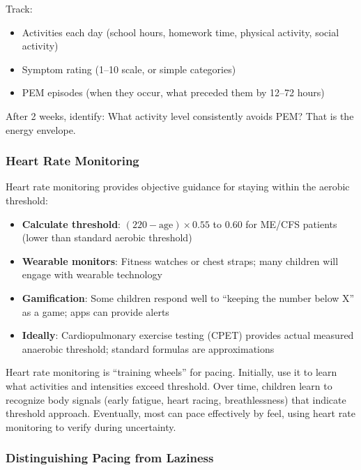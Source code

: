 Track:
\begin{itemize}
    \item Activities each day (school hours, homework time, physical activity, social activity)
    \item Symptom rating (1--10 scale, or simple categories)
    \item PEM episodes (when they occur, what preceded them by 12--72 hours)
\end{itemize}

After 2 weeks, identify: What activity level consistently avoids PEM? That is the energy envelope.

\subsubsection{Heart Rate Monitoring}

Heart rate monitoring provides objective guidance for staying within the aerobic threshold:

\begin{itemize}
    \item \textbf{Calculate threshold}: $(220 - \text{age}) \times 0.55$ to $0.60$ for ME/CFS patients (lower than standard aerobic threshold)
    \item \textbf{Wearable monitors}: Fitness watches or chest straps; many children will engage with wearable technology
    \item \textbf{Gamification}: Some children respond well to ``keeping the number below X'' as a game; apps can provide alerts
    \item \textbf{Ideally}: Cardiopulmonary exercise testing (CPET) provides actual measured anaerobic threshold; standard formulas are approximations
\end{itemize}

\begin{keypoint}
Heart rate monitoring is ``training wheels'' for pacing. Initially, use it to learn what activities and intensities exceed threshold. Over time, children learn to recognize body signals (early fatigue, heart racing, breathlessness) that indicate threshold approach. Eventually, most can pace effectively by feel, using heart rate monitoring to verify during uncertainty.
\end{keypoint}

\subsubsection{Distinguishing Pacing from Laziness}


